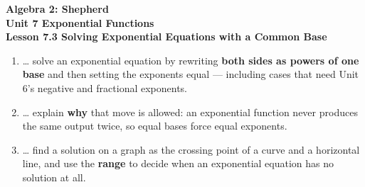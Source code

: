 \documentclass[10pt]{article}
\begin{document}
\vspace{-0.8in}

\begin{center}
  {\color{white}\textbf{\LARGE Algebra 2: Shepherd}}\\[4pt]
  {\color{forestmid}\large\textbf{Unit 7 \quad Exponential Functions}}\\[6pt]
  {\color{white}\textbf{\large Lesson 7.3 \quad Solving Exponential Equations with a Common Base}}
\end{center}

\vspace{0.22in}
\namedateperiod
\vspace{0.18in}

\begin{learningtargetbox}
\small
\begin{enumerate}[leftmargin=1.5em, itemsep=5pt]
  \item \ldots{} solve an exponential equation by rewriting \textbf{both sides as powers of one base} and then setting the exponents equal --- including cases that need Unit 6's negative and fractional exponents.
  \item \ldots{} explain \textbf{why} that move is allowed: an exponential function never produces the same output twice, so equal bases force equal exponents.
  \item \ldots{} find a solution on a graph as the crossing point of a curve and a horizontal line, and use the \textbf{range} to decide when an exponential equation has no solution at all.
\end{enumerate}
\end{learningtargetbox}

\vspace{0.14in}
\end{document}

